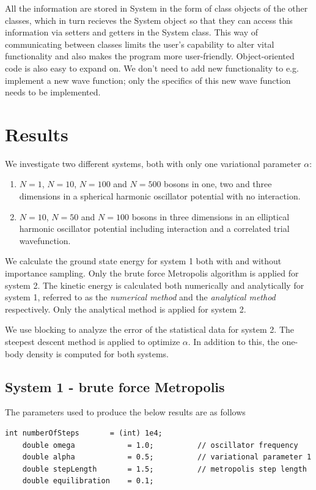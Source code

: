 \documentclass[english, a4paper]{article}
\begin{document}
\noindent All the information are stored in System in the form of class objects of the other classes, which in turn 
recieves the System object so that they can access this information via
setters and getters in the System class. This way of communicating between classes limits the user's 
capability to alter vital functionality and also makes the program more user-friendly. 
Object-oriented code is also easy to expand on. We don't need to add new functionality to
e.g. implement a new wave function; only the specifics of this new wave function needs to be implemented. 


\section{Results}

We investigate two different systems, both with only one variational parameter $\alpha$:
\begin{enumerate}
 \item $N=1$, $N=10$, $N=100$ and $N=500$ bosons in one, two and three dimensions in a
       spherical harmonic oscillator potential with no interaction.       
 \item $N=10$, $N=50$ and $N=100$ bosons in three dimensions
       in an elliptical harmonic oscillator potential including interaction and a
       correlated trial wavefunction. 
\end{enumerate}

\noindent We calculate the ground state energy for system 1 both with and without importance sampling.
Only the brute force Metropolis algorithm is applied for system 2.
The kinetic energy is calculated both numerically and analytically for system 1, 
referred to as the \textit{numerical method} and the \textit{analytical method} respectively.
Only the analytical method is applied for system 2. 

\noindent We use blocking to analyze the error of the statistical data for system 2.
The steepest descent method is applied to optimize $\alpha$. 
In addition to this, the one-body density is computed for both systems.


\subsection{System 1 - brute force Metropolis}

The parameters used to produce the below results are as follows
\belowcaptionskip=-10pt
\begin{lstlisting}[label=parameters1,caption=Parameters brute force Metropolis system 1]
    int numberOfSteps       = (int) 1e4;
    double omega            = 1.0;          // oscillator frequency
    double alpha            = 0.5;          // variational parameter 1
    double stepLength       = 1.5;          // metropolis step length
    double equilibration    = 0.1;          
\end{lstlisting}
\end{document}
